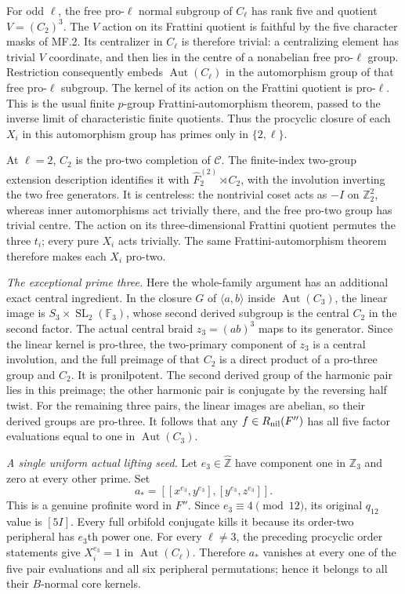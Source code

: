 For odd $\ell$, the free pro-$\ell$ normal subgroup of
$C_\ell$ has rank five and quotient $V=(C_2)^3$. The
$V$ action on its Frattini quotient is faithful by the
five character masks of MF.2. Its centralizer in $C_\ell$
is therefore trivial: a centralizing element has trivial
$V$ coordinate, and then lies in the centre of a
nonabelian free pro-$\ell$ group. Restriction consequently
embeds $\operatorname{Aut}(C_\ell)$ in the automorphism
group of that free pro-$\ell$ subgroup. The kernel of
its action on the Frattini quotient is pro-$\ell$.
This is the usual finite $p$-group Frattini-automorphism
theorem, passed to the inverse limit of characteristic
finite quotients. Thus the procyclic closure of each
$X_i$ in this automorphism group has primes only in
$\{2,\ell\}$.

At $\ell=2$, $C_2$ is the pro-two completion of
$\mathcal C$. The finite-index two-group extension
description identifies it with
$\widehat F_2^{(2)}\rtimes C_2$, with the involution
inverting the two free generators. It is centreless:
the nontrivial coset acts as $-I$ on
$\mathbb Z_2^2$, whereas inner automorphisms act trivially
there, and the free pro-two group has trivial centre.
The action on its three-dimensional Frattini quotient
permutes the three $t_i$; every pure $X_i$ acts trivially.
The same Frattini-automorphism theorem therefore makes
each $X_i$ pro-two.

\emph{The exceptional prime three.}
Here the whole-family argument has an additional exact
central ingredient. In the closure $G$ of $\langle a,b\rangle$
inside $\operatorname{Aut}(C_3)$, the linear image is
$S_3\times\operatorname{SL}_2(\mathbb F_3)$, whose
second derived subgroup is the central $C_2$ in the
second factor. The actual central braid $z_3=(ab)^3$
maps to its generator. Since the linear kernel is
pro-three, the two-primary component of $z_3$ is a
central involution, and the full preimage of that
$C_2$ is a direct product of a pro-three group and
$C_2$. It is pronilpotent. The second derived group
of the harmonic pair lies in this preimage; the other
harmonic pair is conjugate by the reversing half twist.
For the remaining three pairs, the linear images are
abelian, so their derived groups are pro-three.
It follows that any $f\in R_{\rm nil}(F'')$ has all
five factor evaluations equal to one in
$\operatorname{Aut}(C_3)$.

\emph{A single uniform actual lifting seed.}
Let $e_3\in\widehat{\mathbb Z}$ have component one in
$\mathbb Z_3$ and zero at every other prime. Set
\[
        a_*=[[x^{e_3},y^{e_3}],[y^{e_3},z^{e_3}]].
\]
This is a genuine profinite word in $F''$.
Since $e_3\equiv4\pmod{12}$, its original $q_{12}$
value is $[5I]$. Every full orbifold conjugate kills
it because its order-two peripheral has $e_3$th power
one. For every $\ell\ne3$, the preceding procyclic
order statements give $X_i^{e_3}=1$ in
$\operatorname{Aut}(C_\ell)$. Therefore $a_*$ vanishes
at every one of the five pair evaluations and all
six peripheral permutations; hence it belongs to
all their $B$-normal core kernels.

